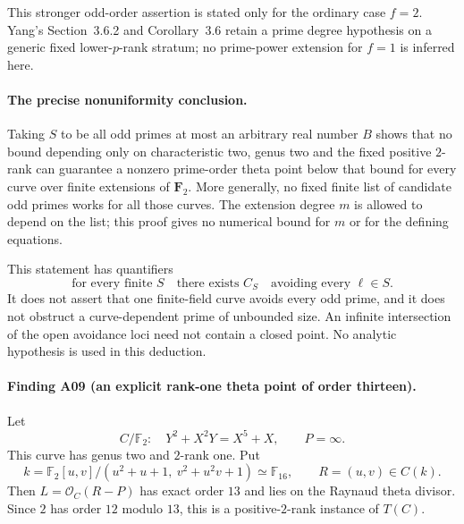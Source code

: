 \documentclass[11pt,a4paper]{article}
\begin{document}
This stronger odd-order assertion is stated only for the ordinary
case $f=2$.  Yang's Section~3.6.2 and Corollary~3.6 retain a prime
degree hypothesis on a generic fixed lower-$p$-rank stratum; no
prime-power extension for $f=1$ is inferred here.

\paragraph{The precise nonuniformity conclusion.}
Taking $S$ to be all odd primes at most an arbitrary real number $B$
shows that no bound depending only on characteristic two, genus two
and the fixed positive $2$-rank can guarantee a nonzero prime-order
theta point below that bound for every curve over finite extensions
of $\mathbf F_2$.  More generally, no fixed finite list of candidate
odd primes works for all those curves.  The extension degree $m$ is
allowed to depend on the list; this proof gives no numerical bound
for $m$ or for the defining equations.

This statement has quantifiers
\[
 \text{for every finite }S\quad\text{there exists }C_S
 \quad\text{avoiding every }\ell\in S.
\]
It does not assert that one finite-field curve avoids every odd prime,
and it does not obstruct a curve-dependent prime of unbounded size.
An infinite intersection of the open avoidance loci need not contain
a closed point.  No analytic hypothesis is used in this deduction.


\paragraph{Finding A09 (an explicit rank-one theta point of order thirteen).}
Let
\[
 C/\mathbb F_2:\quad Y^2+X^2Y=X^5+X,\qquad P=\infty.
\]
This curve has genus two and $2$-rank one. Put
\[
 k=\mathbb F_2[u,v]/(u^2+u+1,\ v^2+u^2v+1)\simeq\mathbb F_{16},
 \qquad R=(u,v)\in C(k).
\]
Then $L=\mathcal O_C(R-P)$ has exact order $13$ and lies on the
Raynaud theta divisor. Since $2$ has order $12$ modulo $13$,
this is a positive-$2$-rank instance of $T(C)$.
\end{document}
